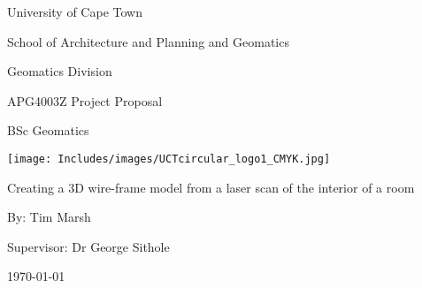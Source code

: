 
\begin{center}
{\Huge University of Cape Town}
\linebreak \linebreak

{\LARGE School of Architecture and Planning and Geomatics}
\linebreak \linebreak

{\Large Geomatics Division}
\linebreak \linebreak


{\Large APG4003Z Project Proposal}
\linebreak

{\Large BSc Geomatics}
\linebreak \linebreak

\begin{center}
\texttt{[image: Includes/images/UCTcircular\_logo1\_CMYK.jpg]}
\linebreak \linebreak
\end{center}

{\Large Creating a 3D wire-frame model from a laser scan of the interior of a room}
\linebreak \linebreak

{\Large By: Tim Marsh}
\linebreak \linebreak

{\Large Supervisor: Dr George Sithole}
\linebreak \linebreak

{\Large \today}

\end{center}
